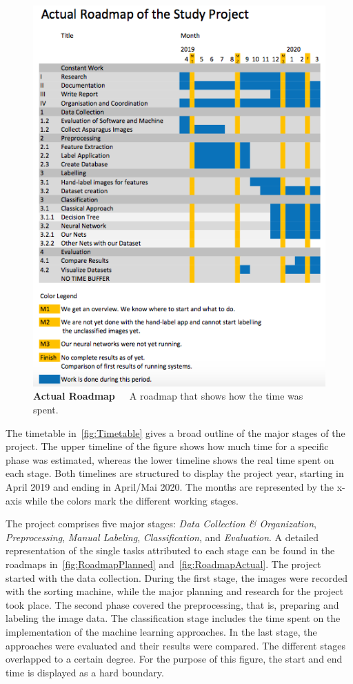 \begin{figure}[h]
	\centering
	\includegraphics[scale=0.7]{Figures/chapter02/roadmap_actual.png}
	\decoRule
	\caption[Actual Roadmap]{\textbf{Actual Roadmap}~~~A roadmap that shows how the time was spent.}
	\label{fig:RoadmapActual}
\end{figure}

The timetable in~\autoref{fig:Timetable} gives a broad outline of the major stages of the project. The upper timeline of the figure shows how much time for a specific phase was estimated, whereas the lower timeline shows the real time spent on each stage. Both timelines are structured to display the project year, starting in April 2019 and ending in April/Mai 2020. The months are represented by the x-axis while the colors mark the different working stages.

The project comprises five major stages: \textit{Data Collection \& Organization}, \textit{Preprocessing}, \textit{Manual Labeling}, \textit{Classification}, and \textit{Evaluation}. A detailed representation of the single tasks attributed to each stage can be found in the roadmaps in~\autoref{fig:RoadmapPlanned} and~\autoref{fig:RoadmapActual}. The project started with the data collection. During the first stage, the images were recorded with the sorting machine, while the major planning and research for the project took place. The second phase covered the preprocessing, that is, preparing and labeling the image data. The classification stage includes the time spent on the implementation of the machine learning approaches. In the last stage, the approaches were evaluated and their results were compared. The different stages overlapped to a certain degree. For the purpose of this figure, the start and end time is displayed as a hard boundary.

